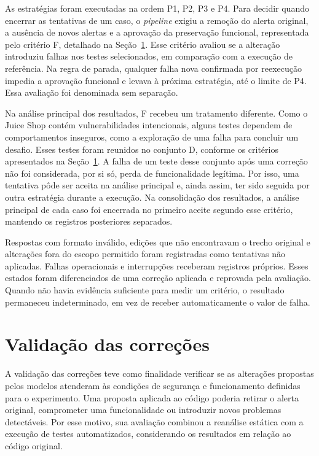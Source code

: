 As estratégias foram executadas na ordem P1, P2, P3 e P4. Para decidir quando encerrar as tentativas de um caso, o \textit{pipeline} exigiu a remoção do alerta original, a ausência de novos alertas e a aprovação da preservação funcional, representada pelo critério F, detalhado na Seção~\ref{sec:met-validacao}. Esse critério avaliou se a alteração introduziu falhas nos testes selecionados, em comparação com a execução de referência. Na regra de parada, qualquer falha nova confirmada por reexecução impedia a aprovação funcional e levava à próxima estratégia, até o limite de P4. Essa avaliação foi denominada sem separação.

Na análise principal dos resultados, F recebeu um tratamento diferente. Como o Juice Shop contém vulnerabilidades intencionais, alguns testes dependem de comportamentos inseguros, como a exploração de uma falha para concluir um desafio. Esses testes foram reunidos no conjunto D, conforme os critérios apresentados na Seção~\ref{sec:met-validacao}. A falha de um teste desse conjunto após uma correção não foi considerada, por si só, perda de funcionalidade legítima. Por isso, uma tentativa pôde ser aceita na análise principal e, ainda assim, ter sido seguida por outra estratégia durante a execução. Na consolidação dos resultados, a análise principal de cada caso foi encerrada no primeiro aceite segundo esse critério, mantendo os registros posteriores separados.

Respostas com formato inválido, edições que não encontravam o trecho original e alterações fora do escopo permitido foram registradas como tentativas não aplicadas. Falhas operacionais e interrupções receberam registros próprios. Esses estados foram diferenciados de uma correção aplicada e reprovada pela avaliação. Quando não havia evidência suficiente para medir um critério, o resultado permaneceu indeterminado, em vez de receber automaticamente o valor de falha.

\section{Validação das correções}
\label{sec:met-validacao}

A validação das correções teve como finalidade verificar se as alterações propostas pelos modelos atenderam às condições de segurança e funcionamento definidas para o experimento. Uma proposta aplicada ao código poderia retirar o alerta original, comprometer uma funcionalidade ou introduzir novos problemas detectáveis. Por esse motivo, sua avaliação combinou a reanálise estática com a execução de testes automatizados, considerando os resultados em relação ao código original.

